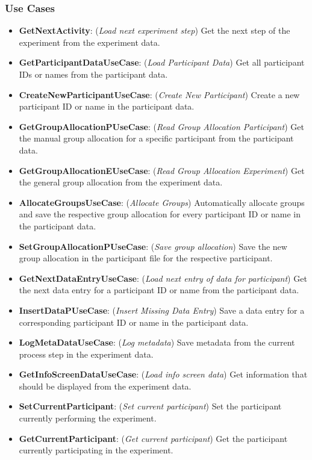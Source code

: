 \subsubsection*{Use Cases}
\begin{itemize}
    \item \textbf{GetNextActivity}: (\textit{Load next experiment step}) Get the next step of the experiment from the experiment data.
    \item \textbf{GetParticipantDataUseCase}: (\textit{Load Participant Data}) Get all participant IDs or names from the participant data. 
    \item \textbf{CreateNewParticipantUseCase}: (\textit{Create New Participant}) Create a new participant ID or name in the participant data.
    \item \textbf{GetGroupAllocationPUseCase}: (\textit{Read Group Allocation Participant}) Get the manual group allocation for a specific participant from the participant data.
    \item \textbf{GetGroupAllocationEUseCase}: (\textit{Read Group Allocation Experiment}) Get the general group allocation from the experiment data.
    \item \textbf{AllocateGroupsUseCase}: (\textit{Allocate Groups}) Automatically allocate groups and save the respective group allocation for every participant ID or name in the participant data. 
    \item \textbf{SetGroupAllocationPUseCase}: (\textit{Save group allocation}) Save the new group allocation in the participant file for the respective participant.
    \item \textbf{GetNextDataEntryUseCase}: (\textit{Load next entry of data for participant}) Get the next data entry for a participant ID or name from the participant data. 
    \item \textbf{InsertDataPUseCase}: (\textit{Insert Missing Data Entry}) Save a data entry for a corresponding participant ID or name in the participant data.
    \item \textbf{LogMetaDataUseCase}: (\textit{Log metadata}) Save metadata from the current process step in the experiment data.
    \item \textbf{GetInfoScreenDataUseCase}: (\textit{Load info screen data}) Get information that should be displayed from the experiment data.  
    \item \textbf{SetCurrentParticipant}: (\textit{Set current participant}) Set the participant currently performing the experiment.  
    \item \textbf{GetCurrentParticipant}: (\textit{Get current participant}) Get the participant currently participating in the experiment.  
\end{itemize}
